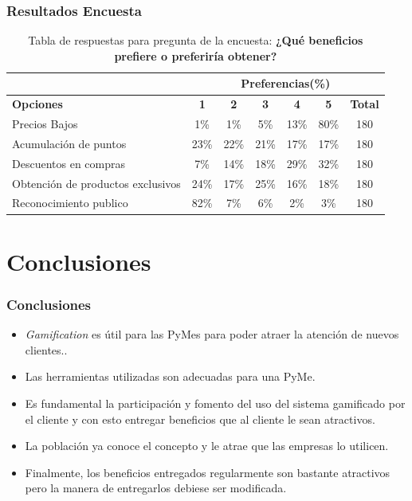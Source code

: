 \documentclass[10pt, compress]{beamer}
\begin{document}
\begin{frame}
 \frametitle{Resultados Encuesta}

\begin{table}[h]
\centering
\footnotesize
\begin{tabular}{|l|c|c|c|c|c|c|}
\hline
 & \multicolumn{6}{c|}{{\bf Preferencias(\%)}} \\
\hline
{\bf Opciones} & {\bf 1} & {\bf 2} & {\bf 3} & {\bf 4} & {\bf 5} & {\bf Total}\\
\hline
Precios Bajos & 1\% & 1\% & 5\% & 13\% & 80\% & 180\\
\hline
Acumulación de puntos & 23\% & 22\% & 21\% & 17\% & 17\% & 180\\
\hline
Descuentos en compras & 7\% & 14\% & 18\% & 29\% & 32\% & 180\\
\hline
Obtención de productos exclusivos & 24\% & 17\% & 25\% & 16\% & 18\% & 180\\
\hline
Reconocimiento publico & 82\% & 7\% & 6\% & 2\% & 3\% & 180\\
\hline
\end{tabular}
\caption{Tabla de respuestas para pregunta de la encuesta: {\bf ¿Qué beneficios prefiere o preferiría obtener?}}
\label{tab:Preg7}
\end{table}

\end{frame}

\section{Conclusiones}

\begin{frame}
 \frametitle{Conclusiones}

\begin{itemize}
\item \emph{Gamification} es útil para las PyMes para poder atraer la atención de nuevos clientes..
\item Las herramientas utilizadas son adecuadas para una PyMe.
\item Es fundamental la participación y fomento del uso del sistema gamificado por el cliente y con esto
 entregar beneficios que al cliente le sean atractivos.
\item La población ya conoce el concepto y le atrae que las empresas lo utilicen.
\item Finalmente, los beneficios entregados regularmente son bastante atractivos pero la manera de entregarlos
debiese ser modificada.
\end{itemize}
\end{frame}
\end{document}
